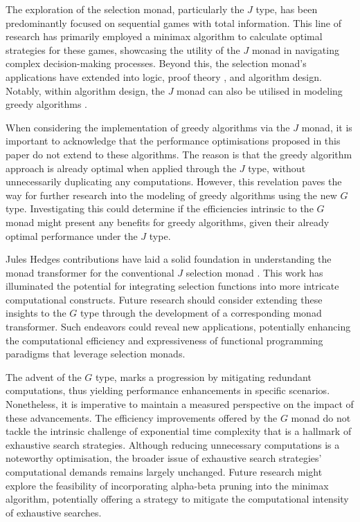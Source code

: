 \documentclass[runningheads]{llncs}
\begin{document}
The exploration of the selection monad, particularly the \(J\) type, has
been predominantly focused on sequential games with total
information\cite{escardo2010sequential}. This line of research has
primarily employed a minimax algorithm to calculate optimal strategies
for these games, showcasing the utility of the \(J\) monad in navigating
complex decision-making processes. Beyond this, the selection monad's
applications have extended into logic, proof theory
\cite{escardo2010sequential}, and algorithm design. Notably, within
algorithm design, the \(J\) monad can also be utilised in modeling
greedy algorithms \cite{hartmann2022algorithm}.

\qquad When considering the implementation of greedy algorithms via the
\(J\) monad, it is important to acknowledge that the performance
optimisations proposed in this paper do not extend to these algorithms.
The reason is that the greedy algorithm approach is already optimal when
applied through the \(J\) type, without unnecessarily duplicating any
computations. However, this revelation paves the way for further
research into the modeling of greedy algorithms using the new \(G\)
type. Investigating this could determine if the efficiencies intrinsic
to the \(G\) monad might present any benefits for greedy algorithms,
given their already optimal performance under the \(J\) type.

\qquad Jules Hedges contributions have laid a solid foundation in
understanding the monad transformer for the conventional \(J\) selection
monad \cite{hedges2014monad}. This work has illuminated the potential
for integrating selection functions into more intricate computational
constructs. Future research should consider extending these insights to
the \(G\) type through the development of a corresponding monad
transformer. Such endeavors could reveal new applications, potentially
enhancing the computational efficiency and expressiveness of functional
programming paradigms that leverage selection monads.

\qquad The advent of the \(G\) type, marks a progression by mitigating
redundant computations, thus yielding performance enhancements in
specific scenarios. Nonetheless, it is imperative to maintain a measured
perspective on the impact of these advancements. The efficiency
improvements offered by the \(G\) monad do not tackle the intrinsic
challenge of exponential time complexity that is a hallmark of
exhaustive search strategies. Although reducing unnecessary computations
is a noteworthy optimisation, the broader issue of exhaustive search
strategies' computational demands remains largely unchanged. Future
research might explore the feasibility of incorporating alpha-beta
pruning into the minimax algorithm, potentially offering a strategy to
mitigate the computational intensity of exhaustive searches.
\end{document}
